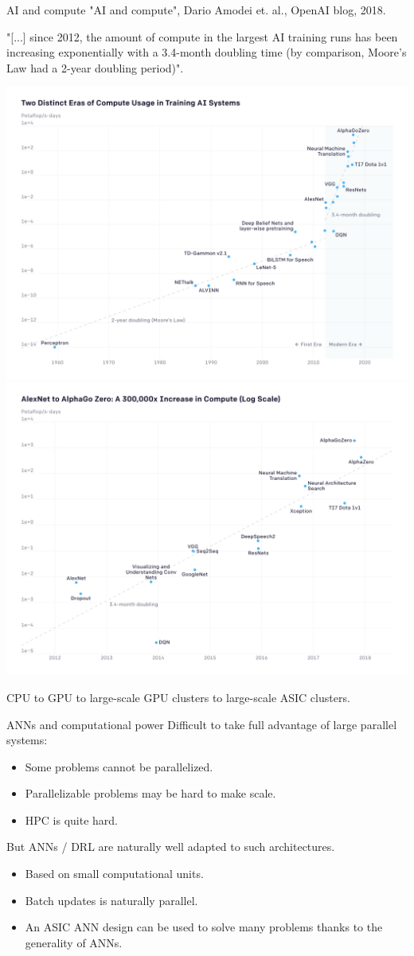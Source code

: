 \documentclass{beamer}
\begin{document}
\begin{frame}{AI and compute}
"AI and compute", Dario Amodei et. al., OpenAI blog, 2018.

\begin{center}
  "[...] since 2012, the amount of compute in the largest AI training runs has been increasing exponentially with a 3.4-month doubling time (by comparison, Moore's Law had a 2-year doubling period)".
\end{center}

\begin{center}
        \includegraphics[width=0.49\linewidth]{Figures/ai-and-compute-all}
		\includegraphics[width=0.49\linewidth]{Figures/ai-and-compute-modern-log}
\end{center}

CPU to GPU to large-scale GPU clusters to large-scale ASIC clusters.

\end{frame}

\begin{frame}{ANNs and computational power}
Difficult to take full advantage of large parallel systems:
\begin{itemize}
    \item Some problems cannot be parallelized.
    \item Parallelizable problems may be hard to make scale.
    \item HPC is quite hard.
\end{itemize}

But ANNs / DRL are naturally well adapted to such architectures.

\begin{itemize}
    \item Based on small computational units.
    \item Batch updates is naturally parallel.
    \item An ASIC ANN design can be used to solve many problems thanks to the generality of ANNs.
\end{itemize}
\end{frame}
\end{document}
